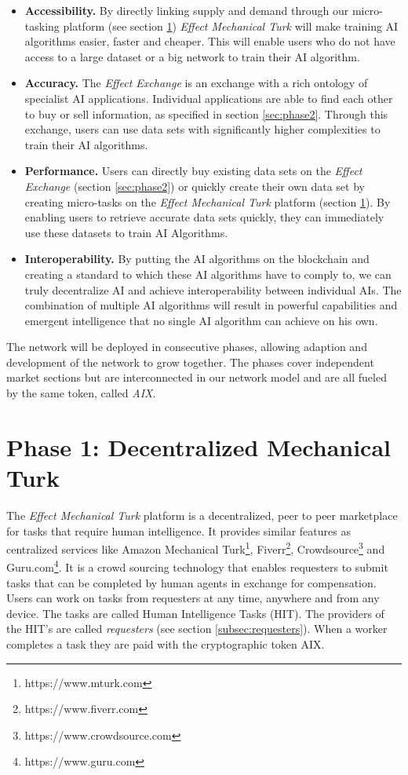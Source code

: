 \documentclass{article}
\begin{document}
\begin{itemize}
\item \textbf{Accessibility.} By directly linking supply and demand
  through our micro-tasking platform (see section \ref{sec:phase1})
  \emph{Effect Mechanical Turk} will make training AI algorithms easier,
  faster and cheaper. This will enable users who do not have access to
  a large dataset or a big network to train their AI algorithm.
\item \textbf{Accuracy.} The \emph{Effect Exchange} is an exchange with
  a rich ontology of specialist AI applications. Individual
  applications are able to find each other to buy or sell information, as
  specified in section \ref{sec:phase2}. Through this exchange, users
  can use data sets with significantly higher complexities to train
  their AI algorithms.
\item \textbf{Performance.} Users can directly buy existing data sets
  on the \emph{Effect Exchange} (section \ref{sec:phase2}) or quickly
  create their own data set by creating micro-tasks on the \emph{Effect
    Mechanical Turk} platform (section \ref{sec:phase1}). By enabling
  users to retrieve accurate data sets quickly, they can immediately
  use these datasets to train AI Algorithms.
\item \textbf{Interoperability.} By putting the AI algorithms on the
  blockchain and creating a standard to which these AI algorithms have
  to comply to, we can truly decentralize AI and achieve
  interoperability between individual AIs. The combination of multiple
  AI algorithms will result in powerful capabilities and emergent
  intelligence that no single AI algorithm can achieve on his own.
\end{itemize}

The network will be deployed in consecutive phases, allowing adaption
and development of the network to grow together. The phases cover
independent market sections but are interconnected in our network model
and are all fueled by the same token, called \emph{AIX}.

\section{Phase 1: Decentralized Mechanical Turk}
\label{sec:phase1}
The \emph{Effect Mechanical Turk} platform is a decentralized, peer to
peer marketplace for tasks that require human intelligence.  It
provides similar features as centralized services like Amazon
Mechanical Turk\footnote{https://www.mturk.com}, Fiverr\footnote{https://www.fiverr.com},
Crowdsource\footnote{https://www.crowdsource.com} and Guru.com\footnote{https://www.guru.com}. It is a crowd sourcing
technology that enables requesters to submit tasks that can be
completed by human agents in exchange for compensation. Users can work
on tasks from requesters at any time, anywhere and from any
device. The tasks are called Human Intelligence Tasks (HIT). The
providers of the HIT’s are called \emph{requesters} (see section \ref{subsec:requesters}). When a worker
completes a task they are paid with the cryptographic token AIX.
\end{document}
